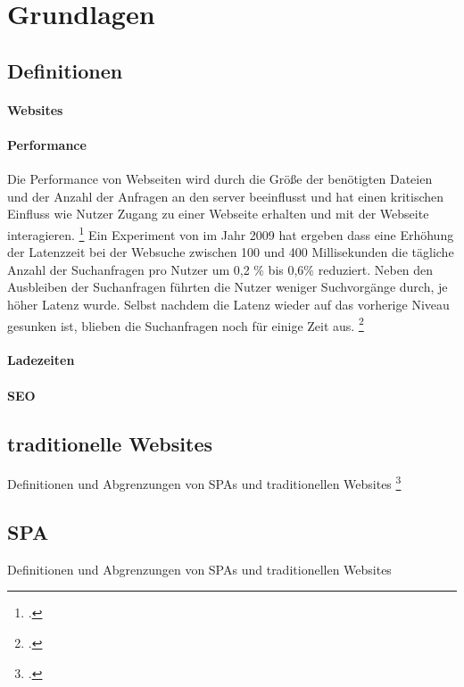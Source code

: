 \section{Grundlagen}
\subsection{Definitionen}
\paragraph*{Websites}
\paragraph*{Performance}
Die Performance von Webseiten wird durch die Größe der benötigten Dateien und der Anzahl der Anfragen an den \gls{server} 
beeinflusst und hat einen kritischen Einfluss wie Nutzer Zugang zu einer Webseite erhalten und mit der Webseite interagieren. \footcite[Vgl.][S. 44]{Robbins2018}
Ein Experiment von  im Jahr 2009 hat ergeben dass eine Erhöhung der Latenzzeit bei der Websuche zwischen 100 und 400 Millisekunden die tägliche
Anzahl der Suchanfragen pro Nutzer um 0,2 \% bis 0,6\% reduziert. 
Neben den Ausbleiben der Suchanfragen führten die Nutzer weniger Suchvorgänge durch, je höher Latenz wurde. 
Selbst nachdem die Latenz wieder auf das vorherige Niveau gesunken ist, blieben die Suchanfragen noch für einige Zeit aus. \footcite[Vgl.][S. 1]{Google2009}
\paragraph*{Ladezeiten}
\paragraph*{SEO}
\subsection{traditionelle Websites}
Definitionen und Abgrenzungen von SPAs und traditionellen Websites
\footcite[Vgl. ][Seite 1]{Scott2015}
\subsection{\ac{SPA}}
Definitionen und Abgrenzungen von SPAs und traditionellen Websites